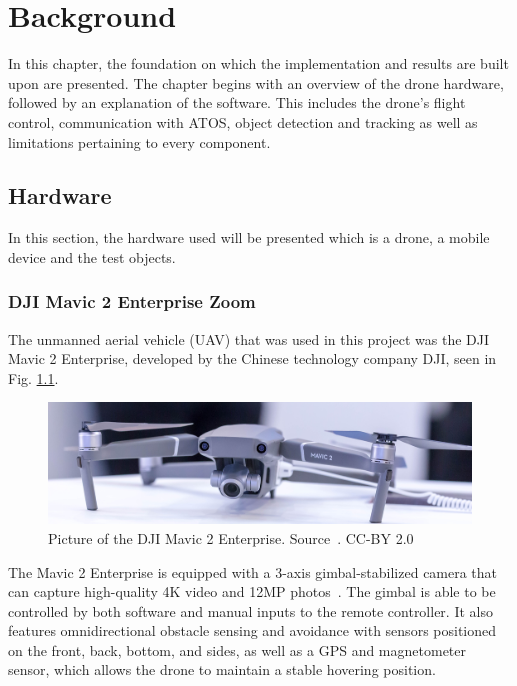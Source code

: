 \chapter{Background} \label{Theory}

In this chapter, the foundation on which the implementation and results are built upon are presented. The chapter begins with an overview of the drone hardware, followed by an explanation of the software. This includes the drone's flight control, communication with ATOS, object detection and tracking as well as limitations pertaining to every component.

\section{Hardware} \label{Hardware}
In this section, the hardware used will be presented which is a drone, a mobile device and the test objects. 

\subsection{DJI Mavic 2 Enterprise Zoom} \label{DJI}
The unmanned aerial vehicle (UAV) that was used in this project was the DJI Mavic 2 Enterprise, developed by the Chinese technology company DJI, seen in Fig. \ref{fig:drone}.
\begin{figure}[h!]
\centering
 \includegraphics[width=\textwidth,angle =0]{figure/bild_på_drönare.jpg}
\caption{Picture of the DJI Mavic 2 Enterprise. Source~\cite{Verc2018Close-upDrone}. CC-BY 2.0}
\label{fig:drone}
\end{figure}
\newline
The Mavic 2 Enterprise is equipped with a 3-axis gimbal-stabilized camera that can capture high-quality 4K video and 12MP photos~\cite{DJI2018MavicDJI}. The gimbal is able to be controlled by both software and manual inputs to the remote controller. It also features omnidirectional obstacle sensing and avoidance with sensors positioned on the front, back, bottom, and sides, as well as a GPS and magnetometer sensor, which allows the drone to maintain a stable hovering position.
\newline

